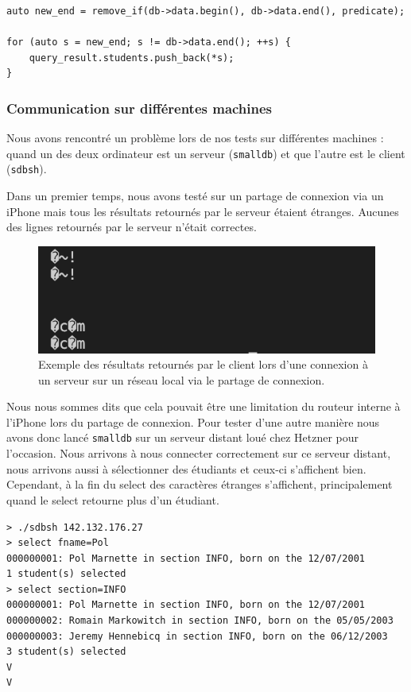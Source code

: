 \documentclass[utf8]{article}
\begin{document}
\begin{lstlisting}
auto new_end = remove_if(db->data.begin(), db->data.end(), predicate);

for (auto s = new_end; s != db->data.end(); ++s) {
	query_result.students.push_back(*s);
}
\end{lstlisting}

\subsubsection{Communication sur différentes machines}

Nous avons rencontré un problème lors de nos tests sur différentes machines : quand un des deux ordinateur est un serveur (\texttt{smalldb}) et que l'autre est le client (\texttt{sdbsh}).

Dans un premier temps, nous avons testé sur un partage de connexion via un iPhone mais tous les résultats retournés par le serveur étaient étranges. Aucunes des lignes retournés par le serveur n'était correctes.

\begin{figure}[ht]
	\includegraphics[scale=0.6]{assets/char-iphone.png}
	\caption{Exemple des résultats retournés par le client lors d'une connexion à un serveur sur un réseau local via le partage de connexion.}
	\label{fig:char_iphone}
\end{figure}

Nous nous sommes dits que cela pouvait être une limitation du routeur interne à l'iPhone lors du partage de connexion. Pour tester d'une autre manière nous avons donc lancé \texttt{smalldb} sur un serveur distant loué chez Hetzner pour l'occasion. Nous arrivons à nous connecter correctement sur ce serveur distant, nous arrivons aussi à sélectionner des étudiants et ceux-ci s'affichent bien. Cependant, à la fin du select des caractères étranges s'affichent, principalement quand le select retourne plus d'un étudiant.

\begin{lstlisting}
> ./sdbsh 142.132.176.27
> select fname=Pol
000000001: Pol Marnette in section INFO, born on the 12/07/2001
1 student(s) selected
> select section=INFO
000000001: Pol Marnette in section INFO, born on the 12/07/2001
000000002: Romain Markowitch in section INFO, born on the 05/05/2003
000000003: Jeremy Hennebicq in section INFO, born on the 06/12/2003
3 student(s) selected
V
V
\end{lstlisting}
\end{document}
